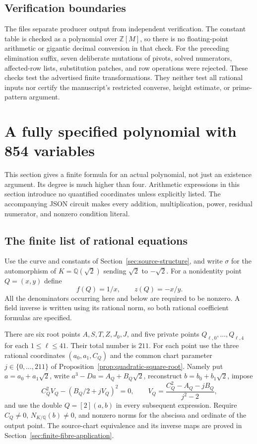 \documentclass[11pt]{article}
\theoremstyle{definition}
\newcommand{\Q}{\mathbb Q}
\newcommand{\Z}{\mathbb Z}
\begin{document}
\subsection{Verification boundaries}

The files separate producer output from independent verification. The
constant table is checked as a polynomial over $\Z[M]$, so there is no
floating-point arithmetic or gigantic decimal conversion in that check.
For the preceding elimination suffix, seven deliberate mutations of
pivots, solved numerators, affected-row lists, substitution patches,
and row operations were rejected. These checks test the advertised
finite transformations.
They neither test all rational inputs nor certify the manuscript's
restricted converse, height estimate, or prime-pattern argument.


\section{A fully specified polynomial with 854 variables}
\label{sec:explicit-circuit}

This section gives a finite formula for an actual polynomial, not just
an existence argument. Its degree is much higher than four. Arithmetic
expressions in this section introduce no quantified coordinates unless
explicitly listed. The accompanying JSON circuit makes every addition,
multiplication, power, residual numerator, and nonzero condition literal.

\subsection{The finite list of rational equations}

Use the curve and constants of Section~\ref{sec:source-structure}, and
write $\sigma$ for the automorphism of $K=\Q(\sqrt2)$ sending
$\sqrt2$ to $-\sqrt2$. For a nonidentity point $Q=(x,y)$ define
\[
 f(Q)=1/x,\qquad z(Q)=-x/y.
\]
All the denominators occurring here and below are required to be
nonzero. A field inverse is written using its rational norm, so both
rational coefficient formulas are specified.

There are six root points $A,S,T,Z,J_0,J$, and five private points
$Q_{\ell,0},\ldots,Q_{\ell,4}$ for each $1\leq\ell\leq41$.
Their total number is $211$. For each point use the three rational
coordinates $(a_0,a_1,C_Q)$ and the common chart parameter
$j\in\{0,\ldots,211\}$ of
Proposition~\ref{prop:quadratic-square-root}. Namely put
$a=a_0+a_1\sqrt2$, write $a^3-Da=A_Q+B_Q\sqrt2$, reconstruct
$b=b_0+b_1\sqrt2$, impose
\[
 C_Q^2 V_Q-(B_Q/2+jV_Q)^2=0,
 \qquad V_Q=\frac{C_Q^2-A_Q-jB_Q}{j^2-2},
\]
and use the double $Q=[2](a,b)$ in every subsequent expression.
Require $C_Q\ne0$, $N_{K/\Q}(b)\ne0$, and nonzero norms for
the abscissa and ordinate of the output point. The source-chart
equivalence and its inverse maps are proved in
Section~\ref{sec:finite-fibre-application}.
\end{document}
